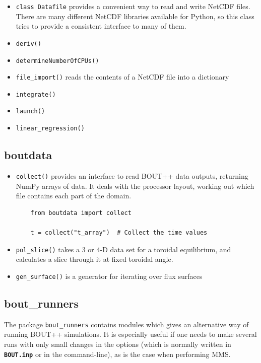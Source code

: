 \documentclass[12pt]{article}
\newcommand{\file}[1]{\texttt{\bf #1}}
\begin{document}
\begin{itemize}
\item \lstinline!class Datafile! provides a convenient way to read and write NetCDF files. There are many different
  NetCDF libraries available for Python, so this class tries to provide a consistent interface to many of them.
\item \lstinline!deriv()!
\item \lstinline!determineNumberOfCPUs()!
\item \lstinline!file_import()! reads the contents of a NetCDF file into a dictionary
\item \lstinline!integrate()!
\item \lstinline!launch()!
\item \lstinline!linear_regression()!
\end{itemize}

\subsection{boutdata}

\begin{itemize}
\item \lstinline!collect()! provides an interface to read BOUT++ data outputs, returning NumPy arrays of data. 
  It deals with the processor layout, working out which file contains each part of the domain.
  \begin{lstlisting}
    from boutdata import collect
    
    t = collect("t_array")  # Collect the time values
  \end{lstlisting}
\item \lstinline!pol_slice()! takes a 3 or 4-D data set for a toroidal equilibrium, and calculates a slice
  through it at fixed toroidal angle.
\item \lstinline!gen_surface()! is a generator for iterating over flux surfaces
\end{itemize}

\subsection{bout\_runners}\label{sec:bout_runners}
The package \lstinline!bout_runners! contains modules which gives an 
alternative way of running BOUT++ simulations. It is especially useful if one 
needs to make several runs with only small changes in the options (which is 
normally written in \file{BOUT.inp} or in the command-line), as is the 
case when performing MMS.
\end{document}
